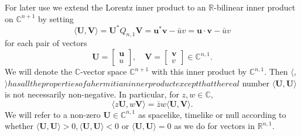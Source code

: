 \documentclass[10pt, letterpaper]{article}
\begin{document}
For later use we extend the Lorentz inner product to an $\mathbb{R}$-bilinear inner product on $\mathbb{C}^{n+1}$ by setting
$$
\langle\mathbf{U}, \mathbf{V}\rangle=\mathbf{U}^{*} Q_{n, 1} \mathbf{V}=\mathbf{u}^{*} \mathbf{v}-\bar{u} v=\mathbf{u} \cdot \mathbf{v}-\bar{u} v
$$
for each pair of vectors
$$
\mathbf{U}=\left[\begin{array}{l}
\mathbf{u} \\
u
\end{array}\right], \quad \mathbf{V}=\left[\begin{array}{l}
\mathbf{v} \\
v
\end{array}\right] \in \mathbb{C}^{n, 1} .
$$
We will denote the $\mathbb{C}$-vector space $\mathbb{C}^{n+1}$ with this inner product by $\mathbb{C}^{n, 1}$. Then $\langle$,$\rangle has all the properties of a hermitian inner product except that the real$ number $\langle\mathbf{U}, \mathbf{U}\rangle$ is not necessarily non-negative. In particular, for $z, w \in \mathbb{C}$,
$$
\langle z \mathbf{U}, w \mathbf{V}\rangle=\bar{z} w\langle\mathbf{U}, \mathbf{V}\rangle .
$$
We will refer to a non-zero $\mathbf{U} \in \mathbb{C}^{n, 1}$ as spacelike, timelike or null according to whether $\langle\mathbf{U}, \mathbf{U}\rangle>0,\langle\mathbf{U}, \mathbf{U}\rangle<0$ or $\langle\mathbf{U}, \mathbf{U}\rangle=0$ as we do for vectors in $\mathbb{R}^{n, 1}$.
\end{document}
